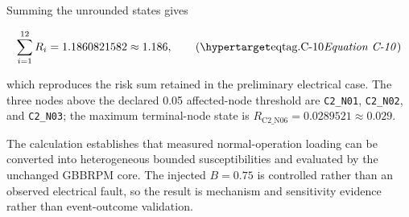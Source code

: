 Summing the unrounded states gives

\[
\sum_{i=1}^{12}R_i=1.1860821582\approx1.186,
\eqtag{C-10}
\]

which reproduces the risk sum retained in the preliminary electrical case. The three nodes above
the declared 0.05 affected-node threshold are \texttt{C2\_N01},
\texttt{C2\_N02}, and \texttt{C2\_N03}; the maximum terminal-node state is
\(R_{\mathrm{C2\_N06}}=0.0289521\approx0.029\).

The calculation establishes that measured normal-operation loading can be
converted into heterogeneous bounded susceptibilities and evaluated by the
unchanged GBBRPM core. The injected \(B=0.75\) is controlled rather than an
observed electrical fault, so the result is mechanism and sensitivity
evidence rather than event-outcome validation.
